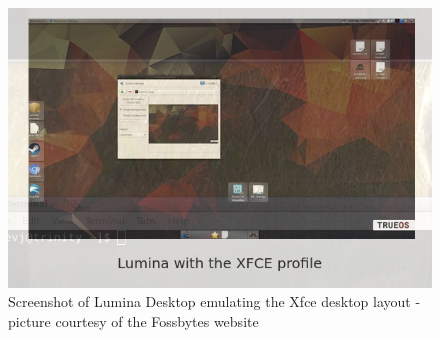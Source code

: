 %

\begin{figure}[!h]
  \centering
   \includegraphics[width=1.0\textwidth]{luminaxfce.png}
  \caption{Screenshot of Lumina Desktop emulating the Xfce desktop layout - picture courtesy of the Fossbytes website}
  \label{fig:xfce}
\end{figure}

%

